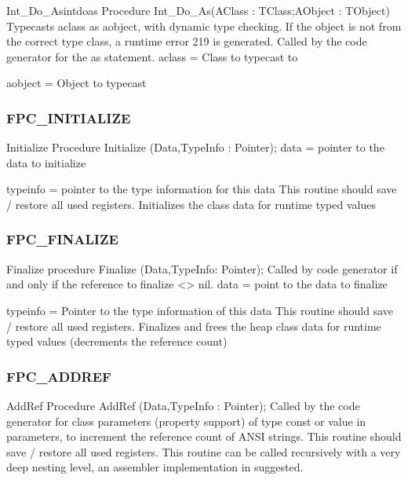 \documentclass [a4paper,12pt]{article}
\begin{document}
\begin{procedurel}{Int{\_}Do{\_}As}{intdoas}
\Declaration
Procedure Int{\_}Do{\_}As(AClass : TClass;AObject : TObject)
\Description
Typecasts \textsf{aclass} as \textsf{aobject}, with dynamic type checking.
If the object is not from the correct type class, a runtime error 219 is
generated. Called by the code generator for the \textsf{as} statement.
\Parameters
aclass = Class to typecast to \par
aobject = Object to typecast
\end{procedurel}

\subsubsection{FPC{\_}INITIALIZE }
\label{subsubsec:mylabel71}

\begin{procedure}{Initialize}
\Declaration
Procedure Initialize (Data,TypeInfo : Pointer);
\Description
\Parameters
data = pointer to the data to initialize \par
typeinfo = pointer to the type information for this data
\Notes
This routine should save / restore all used registers.
\Algorithm
Initializes the class data for runtime typed values
\end{procedure}

\subsubsection{FPC{\_}FINALIZE}
\label{subsubsec:mylabel72}

\begin{procedure}{Finalize}
\Declaration
procedure Finalize (Data,TypeInfo: Pointer);
\Description
Called by code generator if and only if the reference to finalize <> nil.
\Parameters
data = point to the data to finalize \par
typeinfo = Pointer to the type information of this data
\Notes
This routine should save / restore all used registers. Finalizes and frees
the heap class data for runtime typed values (decrements the reference
count)
\end{procedure}

\subsubsection{FPC{\_}ADDREF}
\label{subsubsec:mylabel73}

\begin{procedure}{AddRef}
\Declaration
Procedure AddRef (Data,TypeInfo : Pointer);
\Description
Called by the code generator for class parameters (property support) of type
const or value in parameters, to increment the reference count of ANSI
strings.
\Notes
This routine should save / restore all used registers. This routine can be
called recursively with a very deep nesting level, an assembler
implementation in suggested.
\end{procedure}
\end{document}
